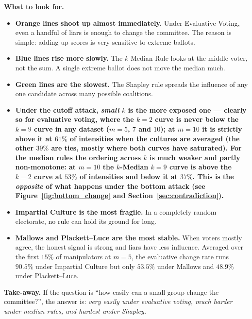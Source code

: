 \documentclass[11pt,a4paper]{article}
\begin{document}
\textbf{What to look for.}
\begin{itemize}
  \item \textbf{Orange lines shoot up almost immediately.} Under Evaluative
        Voting, even a handful of liars is enough to change the committee.
        The reason is simple: adding up scores is very sensitive to extreme
        ballots.
  \item \textbf{Blue lines rise more slowly.} The \(k\)-Median Rule looks at
        the middle voter, not the sum. A single extreme ballot does not move
        the median much.
  \item \textbf{Green lines are the slowest.} The Shapley rule spreads the
        influence of any one candidate across many possible coalitions.
  \item \textbf{Under the cutoff attack, \emph{small} \(k\) is the more
        exposed one --- clearly so for evaluative voting, where the \(k=2\)
        curve is never below the \(k=9\) curve in any dataset (\(m=5\), \(7\)
        and \(10\)); at \(m=10\) it is strictly above it at \(61\%\) of
        intensities when the cultures are averaged (the other \(39\%\) are
        ties, mostly where both curves have saturated). For the median rules
        the ordering across \(k\) is much weaker and partly non-monotone: at
        \(m=10\) the \(k\)-Median \(k=9\) curve is above the \(k=2\) curve at
        \(53\%\) of intensities and below it at \(37\%\). This is the
        \emph{opposite} of what happens under the bottom attack (see
        Figure~\ref{fig:bottom_change} and
        Section~\ref{sec:contradiction}).}
  \item \textbf{Impartial Culture is the most fragile.} In a completely random
        electorate, no rule can hold its ground for long.
  \item \textbf{Mallows and Plackett--Luce are the most stable.} When voters
        mostly agree, the honest signal is strong and liars have less
        influence. Averaged over the first \(15\%\) of manipulators at
        \(m = 5\), the evaluative change rate runs \(90.5\%\) under Impartial
        Culture but only \(53.5\%\) under Mallows and \(48.9\%\) under
        Plackett--Luce.
\end{itemize}

\textbf{Take-away.} If the question is ``how easily can a small group change
the committee?'', the answer is: \emph{very easily under evaluative voting,
much harder under median rules, and hardest under Shapley.}
\end{document}
